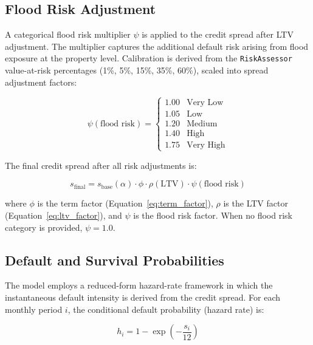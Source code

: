 \documentclass[11pt,a4paper]{article}
\begin{document}
\subsection{Flood Risk Adjustment}
\label{sec:flood_risk}

A categorical flood risk multiplier $\psi$ is applied to the credit spread after LTV
adjustment. The multiplier captures the additional default risk arising from flood
exposure at the property level. Calibration is derived from the \texttt{RiskAssessor}
value-at-risk percentages (1\%, 5\%, 15\%, 35\%, 60\%), scaled into spread adjustment
factors:

\begin{equation}
\label{eq:flood_factor}
\psi(\text{flood risk}) =
\begin{cases}
1.00 & \text{Very Low} \\
1.05 & \text{Low} \\
1.20 & \text{Medium} \\
1.40 & \text{High} \\
1.75 & \text{Very High}
\end{cases}
\end{equation}

\noindent The final credit spread after all risk adjustments is:

\begin{equation}
\label{eq:final_adjusted_spread}
s_{\text{final}} = s_{\text{base}}(\alpha) \cdot \phi \cdot \rho(\text{LTV}) \cdot \psi(\text{flood risk})
\end{equation}

\noindent where $\phi$ is the term factor (Equation~\eqref{eq:term_factor}),
$\rho$ is the LTV factor (Equation~\eqref{eq:ltv_factor}), and $\psi$ is the
flood risk factor. When no flood risk category is provided, $\psi = 1.0$.

\subsection{Default and Survival Probabilities}
\label{sec:hazard}

The model employs a reduced-form hazard-rate framework in which the instantaneous default
intensity is derived from the credit spread. For each monthly period $i$, the conditional
default probability (hazard rate) is:

\begin{equation}
\label{eq:hazard_rate}
h_i = 1 - \exp\!\left(-\frac{s_i}{12}\right)
\end{equation}
\end{document}
